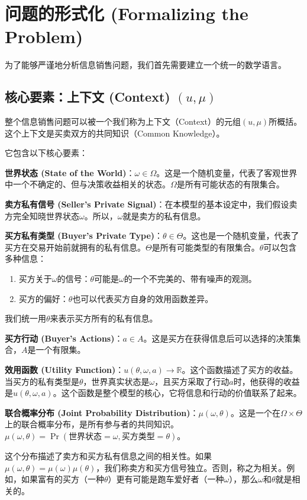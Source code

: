 \section{问题的形式化 (Formalizing the Problem)}

为了能够严谨地分析信息销售问题，我们首先需要建立一个统一的数学语言。

\subsection{核心要素：上下文 (Context) $(u,\mu)$}

整个信息销售问题可以被一个我们称为上下文（Context）的元组$(u, \mu)$所概括。这个上下文是买卖双方的共同知识（Common Knowledge）。

它包含以下核心要素：

\textbf{世界状态 (State of the World)}：$\omega \in \Omega$。这是一个随机变量，代表了客观世界中一个不确定的、但与决策收益相关的状态。$\Omega$是所有可能状态的有限集合。

\textbf{卖方私有信号 (Seller's Private Signal)}：在本模型的基本设定中，我们假设卖方完全知晓世界状态$\omega$。所以，$\omega$就是卖方的私有信息。

\textbf{买方私有类型 (Buyer's Private Type)}：$\theta \in \Theta$。这也是一个随机变量，代表了买方在交易开始前就拥有的私有信息。$\Theta$是所有可能类型的有限集合。$\theta$可以包含多种信息：
\begin{enumerate}
    \item 买方关于$\omega$的信号：$\theta$可能是$\omega$的一个不完美的、带有噪声的观测。
    \item 买方的偏好：$\theta$也可以代表买方自身的效用函数差异。
\end{enumerate}
我们统一用$\theta$来表示买方所有的私有信息。

\textbf{买方行动 (Buyer's Actions)}：$a\in A$。这是买方在获得信息后可以选择的决策集合，$A$是一个有限集。

\textbf{效用函数 (Utility Function)}：$u(\theta, \omega, a) \to \mathbb{R}$。这个函数描述了买方的收益。当买方的私有类型是$\theta$，世界真实状态是$\omega$，且买方采取了行动$a$时，他获得的收益是$u(\theta, \omega, a)$。这个函数是整个模型的核心，它将信息和行动的价值联系了起来。

\textbf{联合概率分布 (Joint Probability Distribution)}：$\mu(\omega, \theta)$。这是一个在$\Omega \times \Theta$上的联合概率分布，是所有参与者的共同知识。$\mu(\omega, \theta)= \Pr(\text{世界状态}=\omega, \text{买方类型}=\theta)$。

这个分布描述了卖方和买方私有信息之间的相关性。如果$\mu(\omega,\theta)=\mu(\omega)\mu(\theta)$，我们称卖方和买方信号独立。否则，称之为相关。例如，如果富有的买方（一种$\theta$）更有可能是跑车爱好者（一种$\omega$），那么$\omega$和$\theta$就是相关的。

